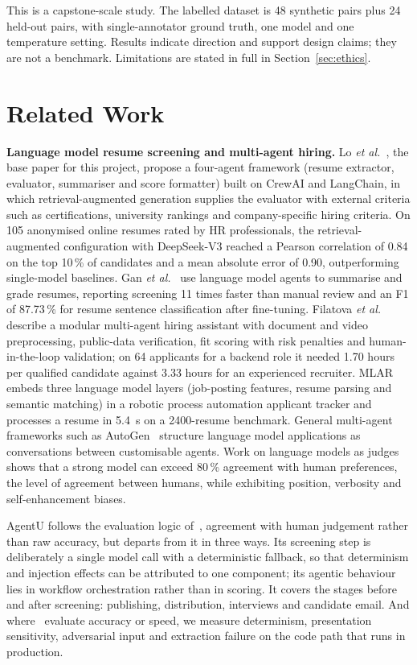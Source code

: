 \documentclass[conference]{IEEEtran}
\begin{document}
This is a capstone-scale study. The labelled dataset is 48 synthetic pairs plus
24 held-out pairs, with single-annotator ground truth, one model and one
temperature setting. Results indicate direction and support design claims; they
are not a benchmark. Limitations are stated in full in
Section~\ref{sec:ethics}.

\section{Related Work}

\textbf{Language model resume screening and multi-agent hiring.} Lo
\textit{et al.}~\cite{b1}, the base paper for this project, propose a four-agent
framework (resume extractor, evaluator, summariser and score formatter) built on
CrewAI and LangChain, in which retrieval-augmented generation supplies the
evaluator with external criteria such as certifications, university rankings and
company-specific hiring criteria. On 105 anonymised online resumes rated by HR
professionals, the retrieval-augmented configuration with DeepSeek-V3 reached a
Pearson correlation of 0.84 on the top 10\,\% of candidates and a mean absolute
error of 0.90, outperforming single-model baselines. Gan \textit{et
al.}~\cite{b2} use language model agents to summarise and grade resumes,
reporting screening 11 times faster than manual review and an F1 of 87.73\,\%
for resume sentence classification after fine-tuning. Filatova \textit{et
al.}~\cite{b3} describe a modular multi-agent hiring assistant with document and
video preprocessing, public-data verification, fit scoring with risk penalties
and human-in-the-loop validation; on 64 applicants for a backend role it needed
1.70 hours per qualified candidate against 3.33 hours for an experienced
recruiter. MLAR~\cite{b4} embeds three language model layers (job-posting
features, resume parsing and semantic matching) in a robotic process automation
applicant tracker and processes a resume in 5.4~s on a 2400-resume benchmark.
General multi-agent frameworks such as AutoGen~\cite{b5} structure language model
applications as conversations between customisable agents. Work on language
models as judges~\cite{b6} shows that a strong model can exceed 80\,\% agreement
with human preferences, the level of agreement between humans, while exhibiting
position, verbosity and self-enhancement biases.

AgentU follows the evaluation logic of~\cite{b1}, agreement with human judgement
rather than raw accuracy, but departs from it in three ways. Its screening step
is deliberately a single model call with a deterministic fallback, so that
determinism and injection effects can be attributed to one component; its
agentic behaviour lies in workflow orchestration rather than in scoring. It
covers the stages before and after screening: publishing, distribution,
interviews and candidate email. And where~\cite{b1,b2,b3,b4} evaluate accuracy
or speed, we measure determinism, presentation sensitivity, adversarial input and
extraction failure on the code path that runs in production.
\end{document}

